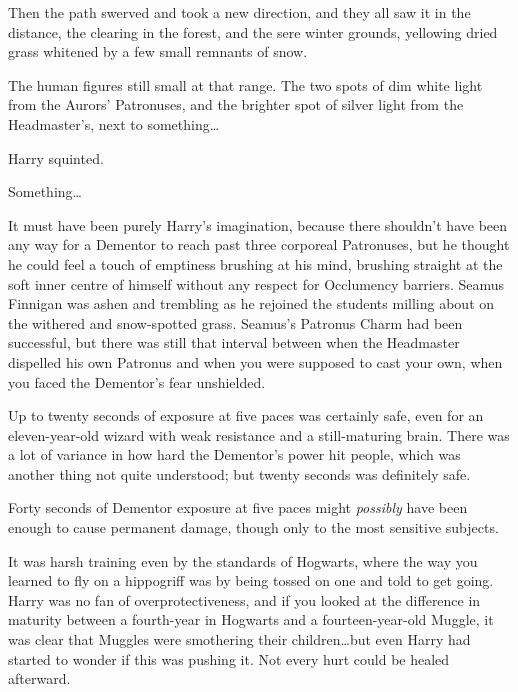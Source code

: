 Then the path swerved and took a new direction, and they all saw it in the
distance, the clearing in the forest, and the sere winter grounds, yellowing
dried grass whitened by a few small remnants of snow.

The human figures still small at that range. The two spots of dim white light
from the Aurors' Patronuses, and the brighter spot of silver light from the
Headmaster's, next to something…

Harry squinted.

Something…

It must have been purely Harry's imagination, because there shouldn't have been
any way for a Dementor to reach past three corporeal Patronuses, but he thought
he could feel a touch of emptiness brushing at his mind, brushing straight at
the soft inner centre of himself without any respect for Occlumency barriers.
\later
Seamus Finnigan was ashen and trembling as he rejoined the students milling
about on the withered and snow-spotted grass. Seamus's Patronus Charm had been
successful, but there was still that interval between when the Headmaster
dispelled his own Patronus and when you were supposed to cast your own, when
you faced the Dementor's fear unshielded.

Up to twenty seconds of exposure at five paces was certainly safe, even for an
eleven-year-old wizard with weak resistance and a still-maturing brain. There
was a lot of variance in how hard the Dementor's power hit people, which was
another thing not quite understood; but twenty seconds was definitely safe.

Forty seconds of Dementor exposure at five paces might \emph{possibly} have
been enough to cause permanent damage, though only to the most sensitive
subjects.

It was harsh training even by the standards of Hogwarts, where the way you
learned to fly on a hippogriff was by being tossed on one and told to get
going. Harry was no fan of overprotectiveness, and if you looked at the
difference in maturity between a fourth-year in Hogwarts and a
fourteen-year-old Muggle, it was clear that Muggles were smothering their
children…but even Harry had started to wonder if this was pushing it.
Not every hurt could be healed afterward.

